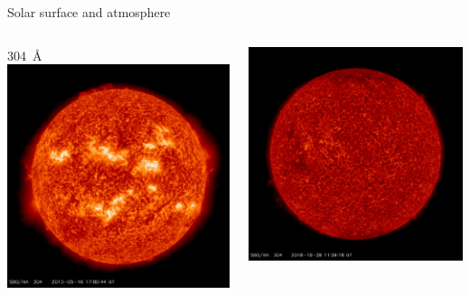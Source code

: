 \begin{frame}[plain,c]{Solar surface and atmosphere}{}
\begin{columns}[c]
		
		\centering \small \SI{304}{\AA} \color{white}{g}
		\includegraphics[width=\textwidth]{../talk_figures/20130516_170044_1024_0304.jpg}
		
		\includegraphics[width=\textwidth]{../talk_figures/20181028_115918_1024_0304.jpg}
		

\end{columns}
\end{frame}
